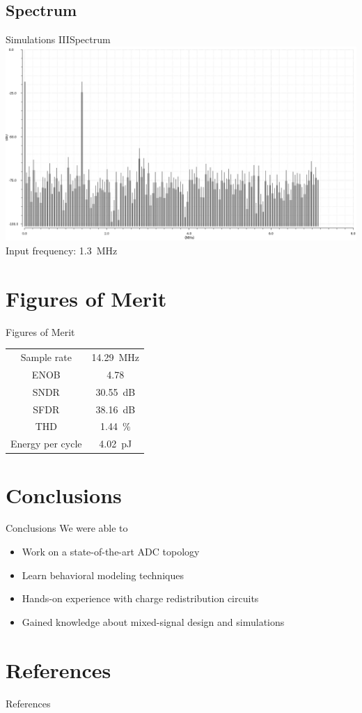 \documentclass{beamer}
\begin{document}
 \subsection{Spectrum}
 \begin{frame}{Simulations III}{Spectrum}
  \centering
  \includegraphics[width=\textwidth]{img/fft}
  Input frequency: \SI{1.3}{\MHz}
 \end{frame}
 \AtBeginSection[]{}
 
 \section{Figures of Merit}
 \begin{frame}{Figures of Merit}
  \centering
  \begin{tabular}[]{cc}
   \toprule
   Sample rate & \SI{14.29}{\MHz}\\
   ENOB & \num{4.78}\\
   SNDR & \SI{30.55}{dB}\\
   SFDR & \SI{38.16}{dB}\\
   THD & \SI{1.44}{\percent}\\
   Energy per cycle & \SI{4.02}{\pico\joule}\\\bottomrule
  \end{tabular}
 \end{frame}
 \section{Conclusions}
 \begin{frame}{Conclusions}
  We were able to
  \begin{itemize}
   \item Work on a state-of-the-art ADC topology
   \item<2-> Learn behavioral modeling techniques
   \item<3-> Hands-on experience with charge redistribution circuits
   \item<4-> Gained knowledge about mixed-signal design and simulations
  \end{itemize}
 \end{frame}

 \section{References}
 \begin{frame}{References}
  \nocite{*}
  
  
 \end{frame}
\end{document}
